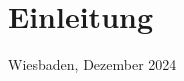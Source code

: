 \chapter{Einleitung}
\label{chap:Einleitung}
%
%
\begin{flushright}
Wiesbaden, Dezember 2024
\end{flushright}